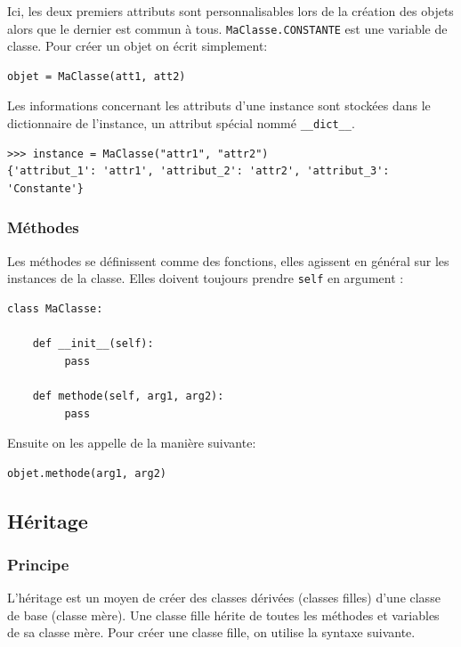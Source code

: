 \documentclass[a4paper, 10pt]{article}
\begin{document}
Ici, les deux premiers attributs sont personnalisables lors de la création des objets alors que le dernier est commun à tous. \texttt{MaClasse.CONSTANTE} est une variable de classe. Pour créer un objet on écrit simplement:

\begin{verbatim}
objet = MaClasse(att1, att2)
\end{verbatim}

Les informations concernant les attributs d'une instance sont stockées dans le dictionnaire de l'instance, un attribut spécial nommé \texttt{__dict__}.

\begin{verbatim}
>>> instance = MaClasse("attr1", "attr2")
{'attribut_1': 'attr1', 'attribut_2': 'attr2', 'attribut_3': 'Constante'}
\end{verbatim}

\subsubsection{Méthodes}
Les méthodes se définissent comme des fonctions, elles agissent en général sur les instances de la classe. Elles doivent toujours prendre \texttt{self} en argument :
\begin{verbatim}
class MaClasse:

    def __init__(self):
         pass

    def methode(self, arg1, arg2):
         pass
\end{verbatim}

Ensuite on les appelle de la manière suivante:
\begin{verbatim}
objet.methode(arg1, arg2)
\end{verbatim}


\subsection{Héritage}

\subsubsection{Principe}

L'héritage est un moyen de créer des classes dérivées (classes filles) d'une classe de base (classe mère). Une classe fille hérite de toutes les méthodes et variables de sa classe mère. Pour créer une classe fille, on utilise la syntaxe suivante.
\end{document}
